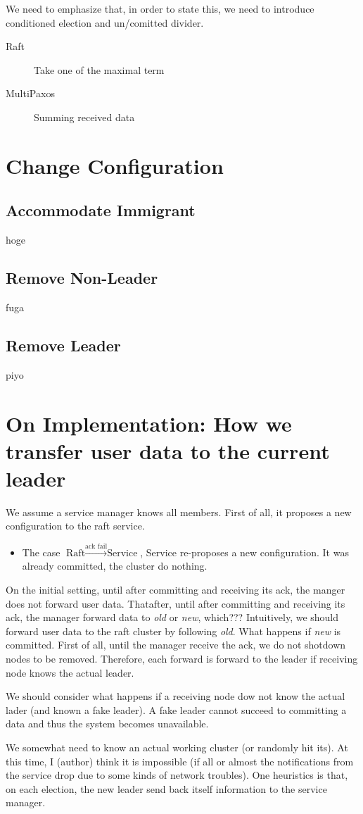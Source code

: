 \documentclass[sigconf,nonacm]{acmart}
\begin{document}
We need to emphasize that, in order to state this, we need to introduce conditioned election and un/comitted divider.

\begin{description}
\item[Raft] Take one of the maximal term
\item[MultiPaxos] Summing received data
\end{description}

\section{Change Configuration}

\subsection{Accommodate Immigrant}
hoge

\subsection{Remove Non-Leader}
fuga

\subsection{Remove Leader}
piyo

\section{On Implementation: How we transfer user data to the current leader}

We assume a service manager knows all members.
First of all, it proposes a new configuration to the raft service.
\begin{itemize}
\item The case $\text{Raft} \xrightarrow{\text{ack fail}} \text{Service}$, Service re-proposes a new configuration. It was already committed, the cluster do nothing.
\end{itemize}
On the initial setting, until after committing and receiving its ack, the manger does not forward user data.
Thatafter, until after committing and receiving its ack, the manager forward data to \emph{old} or \emph{new}, which???
Intuitively, we should forward user data to the raft cluster by following \emph{old}.
What happens if \emph{new} is committed.
First of all, until the manager receive the ack, we do not shotdown nodes to be removed.
Therefore, each forward is forward to the leader if receiving node knows the actual leader.

We should consider what happens if a receiving node dow not know the actual lader (and known a fake leader).
A fake leader cannot succeed to committing a data and thus the system becomes unavailable.

We somewhat need to know an actual working cluster (or randomly hit its).
At this time, I (author) think it is impossible (if all or almost the notifications from the service drop due to some kinds of network troubles).
One heuristics is that, on each election, the new leader send back itself information to the service manager.
\end{document}
